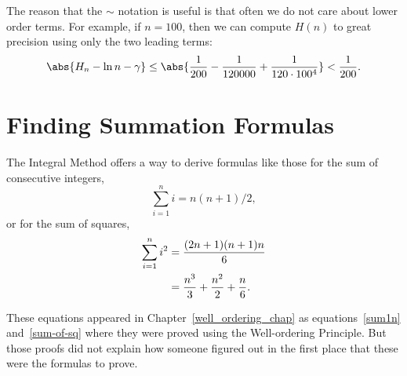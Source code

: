 The reason that the $\sim$ notation is useful is that often we do not care
about lower order terms.  For example, if $n = 100$, then we can compute
$H(n)$ to great precision using only the two leading terms:
\[
\abs{H_n - \ln n - \gamma} \leq \abs{\frac{1}{200} - \frac{1}{120000} +
\frac{1}{120 \cdot 100^4}} < \frac{1}{200}.
\]
\begin{problems}
\classproblems
{}

\homeworkproblems
{}

\end{problems}
\section{Finding Summation Formulas}\label{findsum_sec}

The Integral Method offers a way to derive formulas like those
for the sum of consecutive integers,
\[
\sum_{i=1}^n i = n(n+1)/2,
\]
or for the sum of squares,
\begin{align}
\sum_{i=1}^n i^2 & =  \frac{(2n+1)(n+1)n}{6}\notag \\
                & =  \frac{n^3}{3} + \frac{n^2}{2} + \frac{n}{6}.\label{sumsqcubic}
\end{align}

These equations appeared in Chapter~\ref{well_ordering_chap} as
equations~\eqref{sum1n} and~\eqref{sum-of-sq} where they were proved using
the Well-ordering Principle.  But those proofs did not explain how someone
figured out in the first place that these were the formulas to prove.


